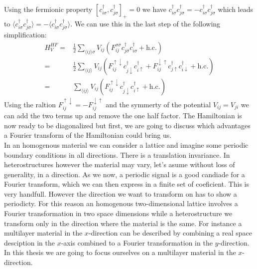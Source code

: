 \documentclass[../main.tex]{subfile}
\begin{document}
Using the fermionic property $[c_{i\sigma}^{\dagger},c_{j\sigma}^{\dagger}]_+ = 0$ we have $c_{i\sigma}^{\dagger} c_{j\sigma}^{\dagger} = -c_{i\sigma}^{\dagger} c_{j\sigma}^{\dagger}$
which leads to $\langle  c_{i\sigma}^{\dagger} c_{j\sigma}^{\dagger} \rangle = -\langle c_{i\sigma}^{\dagger} c_{j\sigma}^{\dagger}\rangle$. We can use this in the last step of the following simplification:
\begin{equation}\label{eq:HF_V}
    \begin{aligned}
        H^{HF}_V =& \frac{1}{2} \sum_{\langle ij\rangle \sigma} V_{ij} \left(F_{ij}^{\sigma \bar{\sigma}} c^{\dagger}_{j\bar{\sigma}}c^{\dagger}_{i\sigma} + \text{h.c.}\right)\\
            =& \frac{1}{2}\sum_{\langle ij\rangle} V_{ij} \left(F_{ij}^{\uparrow \downarrow} c^{\dagger}_{j\downarrow}c^{\dagger}_{i\uparrow} + F_{ij}^{\downarrow\uparrow} c^{\dagger}_{j\uparrow}c^{\dagger}_{i\downarrow} + \text{h.c.}\right)\\
            =& \sum_{\langle ij\rangle} V_{ij} \left(F_{ij}^{\uparrow \downarrow} c^{\dagger}_{j\downarrow}c^{\dagger}_{i\uparrow} + \text{h.c.}\right)
    \end{aligned}
\end{equation}
Using the raltion $F_{ij}^{\uparrow\downarrow} = -F_{ij}^{\downarrow\uparrow}$ and the symmerty of the potential $V_{ij} = V_{ji}$ we can add the two terms up and remove the one half factor.
The Hamiltonian is now ready to be diagonalized but first, we are going to discuss which advantages a Fourier transform of the Hamiltonian could bring us.\\
 
In an homogenous material we can consider a lattice and imagine some periodic boundary conditions in all directions. There is a translation invariance.
In heterostructures however the material may vary, let's asume
without loss of generality, in a direction. As we now, a periodic signal is a good candiade for a Fourier transform, which we can then express in a finite set of coeficient. This is very handfull.
However the direction we want to transform on has to show a periodicty. For this reason an homogenous two-dimensional lattice involves a Fourier transformation in two space dimensions while a heterostructure
we transform only in the direction where the material is the same. For instance a multilayer material in the $x$-direction can be described by combining a real space desciption in the $x$-axis 
combined to a Fourier transformation in the $y$-direction.
In this thesis we are going to focus ourselves on a multilayer material in the $x$-direction.\\
\end{document}

